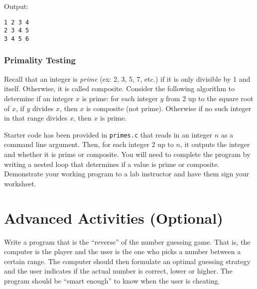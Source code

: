 \documentclass[12pt]{scrartcl}
\begin{document}
Output:

\begin{verbatim}
1 2 3 4
2 3 4 5
3 4 5 6
\end{verbatim}

\subsubsection*{Primality Testing}

Recall that an integer is \emph{prime} (ex: 2, 3, 5, 7, etc.) if it 
is only divisible by 1 and itself.  Otherwise, it is called composite.  
Consider the following algorithm to determine if an integer $x$ is 
prime: for each integer $y$ from 2 up to the square root of $x$, if $y$ 
divides $x$, then $x$ is composite (not prime).  Otherwise if no such 
integer in that range divides $x$, then $x$ is prime.  

Starter code has been provided in \texttt{primes.c}
that reads in an integer $n$ as a command line argument.  Then, for 
each integer 2 up to $n$, it outputs the integer 
and whether it is prime or composite.  You will need to complete
the program by writing a nested loop that determines if a value
is prime or composite.  Demonstrate your working 
program to a lab instructor and have them sign your worksheet.

\section{Advanced Activities (Optional)}

Write a program that is the ``reverse'' of the number guessing game.
That is, the computer is the player and the user is the one who
picks a number between a certain range.  The computer should
then formulate an optimal guessing strategy and the user indicates
if the actual number is correct, lower or higher.  The program
should be ``smart enough'' to know when the user is cheating.
\end{document}
